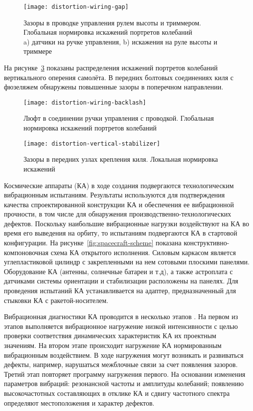 \begin{figure}[!htb]
	\centerfloat
	\texttt{[image: distortion-wiring-gap]}
	\caption{Зазоры в проводке управления рулем высоты и триммером. Глобальная нормировка искажений портретов колебаний \\ a) датчики на ручке управления, b) искажения на руле высоты и триммере} \label{fig:distortion-wiring-gap}
\end{figure}

На рисунке~\ref{fig:distortion-vertical-stabilizer} показаны распределения искажений портретов колебаний вертикального оперения самолёта. В передних болтовых соединениях киля с фюзеляжем обнаружены повышенные зазоры в поперечном направлении. 

\begin{figure}[!htb]
	\centerfloat
	\texttt{[image: distortion-wiring-backlash]}
	\caption{Люфт в соединении ручки управления с проводкой. Глобальная нормировка искажений портретов колебаний} \label{fig:distortion-wiring-backlash}
\end{figure}

\begin{figure}[!htb]
	\centerfloat
	\texttt{[image: distortion-vertical-stabilizer]}
	\caption{Зазоры в передних узлах крепления киля. Локальная нормировка искажений} \label{fig:distortion-vertical-stabilizer}
\end{figure}

Космические аппараты (КА) в ходе создания подвергаются технологическим вибрационным испытаниям. Результаты используются для подтверждения качества спроектированной конструкции КА и обеспечения ее вибрационной прочности, в том числе для обнаружения производственно-технологических дефектов. Поскольку наибольшие вибрационные нагрузки воздействуют на КА во время его выведения на орбиту, то испытаниям подвергаются КА в стартовой конфигурации. На рисунке~\ref{fig:spacecraft-scheme} показана конструктивно-компоновочная схема КА открытого исполнения. Силовым каркасом является углепластиковой цилиндр с закрепленными на нем сотовыми плоскими панелями. Оборудование КА (антенны, солнечные батареи и т.д), а также астроплата с датчиками системы ориентации и стабилизации расположены на панелях. Для проведения испытаний КА устанавливается на адаптер, предназначенный для стыковки КА с ракетой-носителем.

Вибрационная диагностики КА проводится в несколько этапов \cite{lib:defects:Berns:experience}. На первом из этапов выполняется вибрационное нагружение низкой интенсивности с целью проверки соответствия динамических характеристик КА их проектным значениям. На втором этапе происходит нагружение КА нормированным вибрационным воздействием. В ходе нагружения могут возникать и развиваться дефекты, например, нарушаться межблочные связи за счет появления зазоров. Третий этап повторяет программу нагружения первого. На основании изменения параметров вибраций: резонансной частоты и амплитуды колебаний; появлению высокочастотных составляющих в отклике КА и сдвигу частотного спектра определяют местоположения и характер дефектов.

